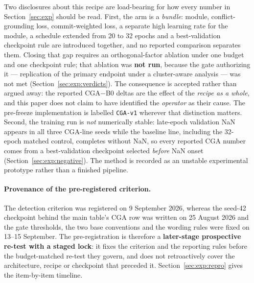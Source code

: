 \documentclass[pdflatex,sn-mathphys-num]{sn-jnl}
\theoremstyle{thmstyleone}%
\theoremstyle{thmstyletwo}%
\theoremstyle{thmstylethree}%
\begin{document}
Two disclosures about this recipe are load-bearing for how every number in Section~\ref{sec:exp} should be read. First, the arm is a \emph{bundle}: module, conflict-grounding loss, commit-weighted loss, a separate high learning rate for the module, a schedule extended from 20 to 32 epochs and a best-validation checkpoint rule are introduced together, and no reported comparison separates them. Closing that gap requires an orthogonal-factor ablation under one budget and one checkpoint rule; that ablation was \textbf{not run}, because the gate authorizing it --- replication of the primary endpoint under a cluster-aware analysis --- was not met (Section~\ref{sec:exp:verdicts}). The consequence is accepted rather than argued away: the reported CGA$-$B0 deltas are the effect of the \emph{recipe as a whole}, and this paper does not claim to have identified the \emph{operator} as their cause. The pre-freeze implementation is labelled \texttt{CGA-v1} wherever that distinction matters. Second, the training run is \emph{not} numerically stable: late-epoch validation NaN appears in all three CGA-line seeds while the baseline line, including the 32-epoch matched control, completes without NaN, so every reported CGA number comes from a best-validation checkpoint selected \emph{before} NaN onset (Section~\ref{sec:exp:negative}). The method is recorded as an unstable experimental prototype rather than a finished pipeline.

\paragraph{Provenance of the pre-registered criterion.} The detection criterion was registered on 9 September 2026, whereas the seed-42 checkpoint behind the main table's CGA row was written on 25 August 2026 and the gate thresholds, the two base conventions and the wording rules were fixed on 13--15 September. The pre-registration is therefore a \textbf{later-stage prospective re-test with a staged lock}: it fixes the criterion and the reporting rules before the budget-matched re-test they govern, and does not retroactively cover the architecture, recipe or checkpoint that preceded it. Section~\ref{sec:exp:repro} gives the item-by-item timeline.
\end{document}
